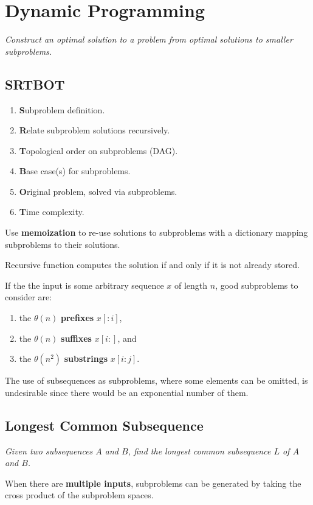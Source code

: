 \section{Dynamic Programming}
\emph{Construct an optimal solution to a problem from optimal solutions to smaller subproblems.}

\subsection{SRTBOT}
\begin{enumerate}
    \item \textbf{S}ubproblem definition.
    \item \textbf{R}elate subproblem solutions recursively.
    \item \textbf{T}opological order on subproblems (DAG).
    \item \textbf{B}ase case(s) for subproblems.
    \item \textbf{O}riginal problem, solved via subproblems.
    \item \textbf{T}ime complexity.
\end{enumerate}

Use \textbf{memoization} to re-use solutions to subproblems with
a dictionary mapping subproblems to their solutions.

Recursive function computes the solution if and only if it is not already stored.

If the the input is some arbitrary sequence $x$ of length $n$, good subproblems to consider are:
\begin{enumerate}
    \item the $\theta(n)$ \textbf{prefixes} $x[:i]$,
    \item the $\theta(n)$ \textbf{suffixes} $x[i:]$, and
    \item the $\theta(n^2)$ \textbf{substrings} $x[i:j]$.
\end{enumerate}

The use of subsequences as subproblems, where some elements can be omitted,
is undesirable since there would be an exponential number of them.

\subsection{Longest Common Subsequence}
\emph{Given two subsequences $A$ and $B$, find the longest common subsequence $L$ of $A$ and $B$.}

When there are \textbf{multiple inputs}, subproblems can be generated by taking the cross product
of the subproblem spaces.

